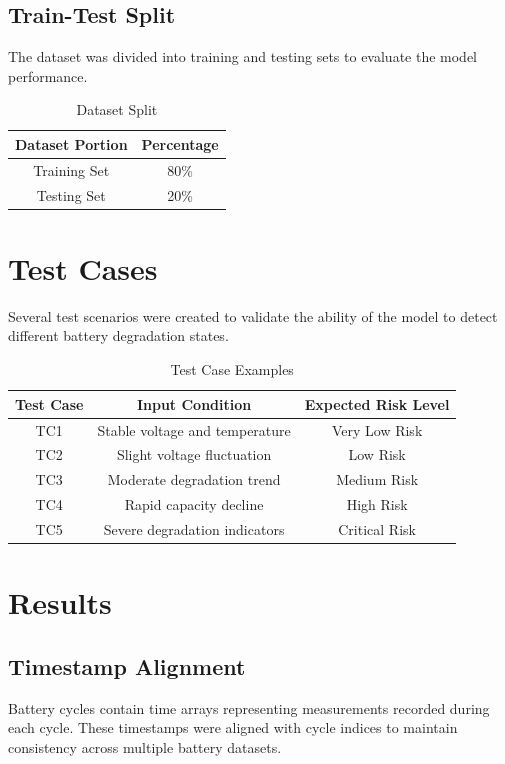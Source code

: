\subsection{Train-Test Split}

The dataset was divided into training and testing sets to evaluate the model performance.

\begin{table}[h]
\centering
\caption{Dataset Split}
\begin{tabular}{|c|c|}
\hline
Dataset Portion & Percentage \\
\hline
Training Set & 80\% \\
Testing Set & 20\% \\
\hline
\end{tabular}
\end{table}

\section{Test Cases}

Several test scenarios were created to validate the ability of the model to detect different battery degradation states.

\begin{table}[h]
\centering
\caption{Test Case Examples}
\begin{tabular}{|c|c|c|}
\hline
Test Case & Input Condition & Expected Risk Level \\
\hline
TC1 & Stable voltage and temperature & Very Low Risk \\
TC2 & Slight voltage fluctuation & Low Risk \\
TC3 & Moderate degradation trend & Medium Risk \\
TC4 & Rapid capacity decline & High Risk \\
TC5 & Severe degradation indicators & Critical Risk \\
\hline
\end{tabular}
\end{table}


\section{Results}

\subsection{Timestamp Alignment}

Battery cycles contain time arrays representing measurements recorded during each cycle. These timestamps were aligned with cycle indices to maintain consistency across multiple battery datasets.

